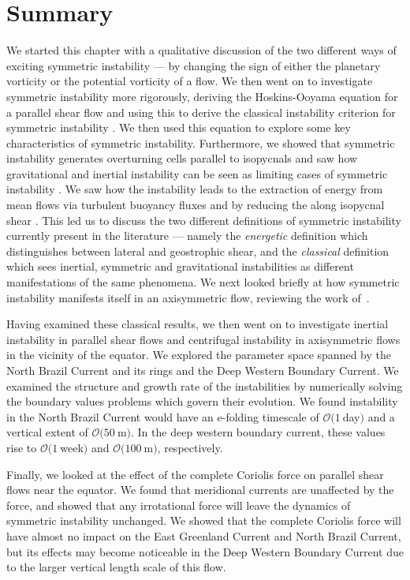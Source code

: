 \section{Summary}
We started this chapter with a qualitative discussion of the two different ways of exciting symmetric instability --- by changing the sign of either the planetary vorticity or the potential vorticity of a flow. We then went on to investigate symmetric instability more rigorously, deriving the Hoskins-Ooyama equation for a parallel shear flow and using this to derive the classical instability criterion for symmetric instability \citep{Ooyama1966, Stone1966, Hoskins1974}. We then used this equation to explore some key characteristics of symmetric instability. Furthermore, we showed that symmetric instability generates overturning cells parallel to isopycnals and saw how gravitational and inertial instability can be seen as limiting cases of symmetric instability \citep{Xu1985, emanuelSlantwiseConvection1994}. We saw how the instability leads to the extraction of energy from mean flows via turbulent buoyancy fluxes and by reducing the along isopycnal shear \citep{Haine1998, Thomas2013}. This led us to discuss the two different definitions of symmetric instability currently present in the literature --- namely the \textit{energetic} definition which distinguishes between lateral and geostrophic shear, and the \textit{classical} definition which sees inertial, symmetric and gravitational instabilities as different manifestations of the same phenomena. We next looked briefly at how symmetric instability manifests itself in an axisymmetric flow, reviewing the work of~\citet{Buckingham2021}.

Having examined these classical results, we then went on to investigate inertial instability in parallel shear flows and centrifugal instability in axisymmetric flows in the vicinity of the equator. We explored the parameter space spanned by the North Brazil Current and its rings and the Deep Western Boundary Current. We examined the structure and growth rate of the instabilities by numerically solving the boundary values problems which govern their evolution. We found instability in the North Brazil Current would have an e-folding timescale of $\mathcal{O}(1~$day$)$ and a vertical extent of $\mathcal{O}(50~$m$)$. In the deep western boundary current, these values rise to $\mathcal{O}(1~$week$)$ and $\mathcal{O}(100~$m$)$, respectively.

Finally, we looked at the effect of the complete Coriolis force on parallel shear flows near the equator. We found that meridional currents are unaffected by the force, and showed that any irrotational force will leave the dynamics of symmetric instability unchanged. We showed that the complete Coriolis force will have almost no impact on the East Greenland Current and North Brazil Current, but its effects may become noticeable in the Deep Western Boundary Current due to the larger vertical length scale of this flow.
